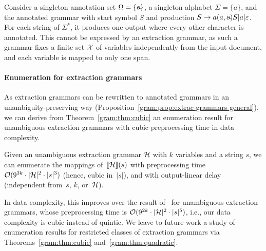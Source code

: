 %
\begin{example}
  Consider a singleton annotation set $\Omega = \{\oout\}$, a singleton alphabet $\Sigma = \{a\}$, and the annotated grammar with start symbol $S$ and production $S \rightarrow a (a, \oout) S | a | \epsilon$. For each string of $\Sigma^*$, it produces one output where every other character is annotated. This cannot be expressed by an extraction grammar, as such a grammar fixes a finite set $\mathcal{X}$ of variables independently from the input document, and each variable is mapped to only one span.
\end{example}


\paragraph{Enumeration for extraction grammars}
As extraction grammars can be rewritten to annotated grammars in an unambiguity-preserving way (Proposition~\ref{gram:prop:extrac-grammars-general}), we can derive from
Theorem~\ref{gram:thm:cubic} an enumeration result for unambiguous extraction grammars with cubic preprocessing time in data complexity.

\begin{theorem}
  Given an unambiguous extraction grammar $\mathcal{H}$ with $k$ variables and a string $s$, we can
  enumerate the mappings of~${\llbracket{\mathcal{H}}\rrbracket}(s)$ with preprocessing time 
  $\mathcal{O}(9^{3k} \cdot |\mathcal{H}|^2 \cdot |s|^3)$ (hence, cubic in~$|s|$), and with output-linear delay
  (independent from~$s$, $k$, or~$\mathcal{H}$).
\end{theorem}

%
%

In data complexity, this improves over the result of~\cite{Peterfreund21}
%
%
%
for unambiguous extraction grammars, whose preprocessing time is
$\mathcal{O}(9^{2k} \cdot |\mathcal{H}|^2 \cdot |s|^5)$, i.e.,
%
%
our data complexity is cubic instead of quintic.
%
%
%
%
We leave to future work a study of enumeration results for
restricted classes of extraction grammars via %
Theorems~\ref{gram:thm:cubic} and~\ref{gram:thm:quadratic}.
%

